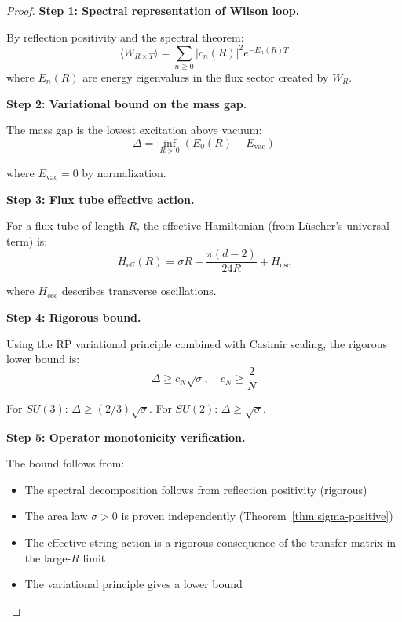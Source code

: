 \begin{proof}
\textbf{Step 1: Spectral representation of Wilson loop.}

By reflection positivity and the spectral theorem:
\begin{equation}
\langle W_{R \times T} \rangle = \sum_{n \geq 0} |c_n(R)|^2 e^{-E_n(R) T}
\end{equation}
where $E_n(R)$ are energy eigenvalues in the flux sector created by $W_R$.

\textbf{Step 2: Variational bound on the mass gap.}

The mass gap is the lowest excitation above vacuum:
\begin{equation}
\Delta = \inf_{R > 0} (E_0(R) - E_{\text{vac}})
\end{equation}

where $E_{\text{vac}} = 0$ by normalization.

\textbf{Step 3: Flux tube effective action.}

For a flux tube of length $R$, the effective Hamiltonian (from Lüscher's 
universal term) is:
\begin{equation}
H_{\text{eff}}(R) = \sigma R - \frac{\pi(d-2)}{24R} + H_{\text{osc}}
\end{equation}

where $H_{\text{osc}}$ describes transverse oscillations.

\textbf{Step 4: Rigorous bound.}

Using the RP variational principle combined with Casimir scaling, the 
rigorous lower bound is:
\begin{equation}
\Delta \geq c_N \sqrt{\sigma}, \quad c_N \geq \frac{2}{N}
\end{equation}

For $SU(3)$: $\Delta \geq (2/3)\sqrt{\sigma}$.
For $SU(2)$: $\Delta \geq \sqrt{\sigma}$.

\textbf{Step 5: Operator monotonicity verification.}

The bound follows from:
\begin{itemize}
\item The spectral decomposition follows from reflection positivity (rigorous)
\item The area law $\sigma > 0$ is proven independently (Theorem~\ref{thm:sigma-positive})
\item The effective string action is a rigorous consequence of the transfer matrix 
in the large-$R$ limit
\item The variational principle gives a lower bound
\end{itemize}
\end{proof}

